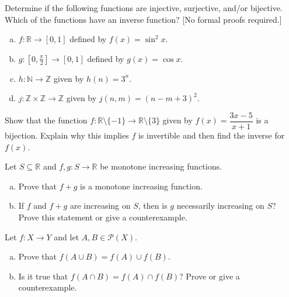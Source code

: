 \documentclass[11pt,letterpaper]{article}
\begin{document}
\homework{}

 Determine if the following functions are injective, surjective, and/or bijective. Which of the functions have an inverse function? [No formal proofs required.]
\begin{enumerate}[(a)]
\item $f: \mathbb{R} \to [0,1]$ defined by $f(x)= \sin^2 x$.
\item $g: [0, \frac{\pi}{2}] \to [0, 1]$ defined by $g(x)= \cos x$.
\item $h: \mathbb{N} \to \mathbb{Z}$ given by $h(n)= 3^n$.
\item $j: \mathbb{Z} \times \mathbb{Z} \to \mathbb{Z}$ given by $j(n, m)= (n - m + 3)^2$.
\end{enumerate}





\newpage





 Show that the function $f: \mathbb{R} \setminus \{ -1 \} \to \mathbb{R} \setminus \{ 3 \}$ given by $f(x)= \dfrac{3x - 5}{x + 1}$ is a bijection. Explain why this implies $f$ is invertible and then find the inverse for $f(x)$. 





\newpage





 Let $S \subseteq \mathbb{R}$ and $f, g: S \to \mathbb{R}$ be monotone increasing functions. 
\begin{enumerate}[(a)]
\item Prove that $f + g$ is a monotone increasing function. 
\item If $f$ and $f + g$ are increasing on $S$, then is $g$ necessarily increasing on $S$? Prove this statement or give a counterexample. 
\end{enumerate}





\newpage





 Let $f: X \to Y$ and let $A, B \in \mathcal{P}(X)$. 
\begin{enumerate}[(a)]
\item Prove that $f(A \cup B)= f(A) \cup f(B)$. 
\item Is it true that $f(A \cap B)= f(A) \cap f(B)$? Prove or give a counterexample. 
\end{enumerate}
\end{document}
